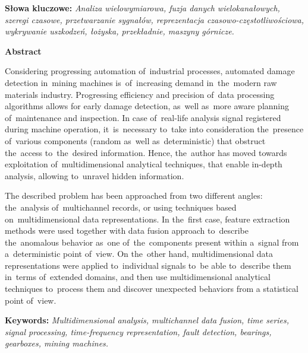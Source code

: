 \documentclass[a4paper,onecolumn,twoside,12pt]{mwrep}
\begin{document}
\vspace*{\baselineskip}

\noindent\textbf{Słowa kluczowe:} \textit{Analiza wielowymiarowa, fuzja danych wielokanałowych, szeregi czasowe, przetwarzanie sygnałów, reprezentacja czasowo-częstotliwościowa, wykrywanie uszkodzeń, łożyska, przekładnie, maszyny górnicze.}

\cleardoublepage
\thispagestyle{empty}
\newpage
\begin{center}
\textbf{Abstract}
\end{center}

Considering progressing automation of~industrial processes, automated damage detection in~mining machines is~of~increasing demand in~the~modern raw materials industry. Progressing efficiency and precision of~data processing algorithms allows for early damage detection, as~well as~more aware planning of~maintenance and inspection. In case of~real-life analysis signal registered during machine operation, it~is~necessary to~take into consideration the~presence of~various components (random as~well as~deterministic) that obstruct the~access to~the~desired information. Hence, the~author has moved towards exploitation of~multidimensional analytical techniques, that enable in-depth analysis, allowing to~unravel hidden information.

The described problem has been approached from two different angles: the~analysis of~multichannel records, or using techniques based on~multidimensional data representations. In the~first case, feature extraction methods were used together with data fusion approach to~describe the~anomalous behavior as~one of~the~components present within a~signal from a~deterministic point of~view. On the~other hand, multidimensional data representations were applied to~individual signals to~be able to~describe them in~terms of~extended domains, and then use multidimensional analytical techniques to~process them and discover unexpected behaviors from a statistical point of~view.

\vspace*{\baselineskip}

\noindent\textbf{Keywords:} \textit{Multidimensional analysis, multichannel data fusion, time series, signal processing, time-frequency representation, fault detection, bearings, gearboxes, mining machines.}


\end{document}
